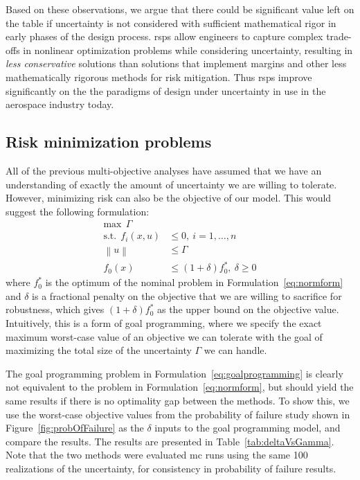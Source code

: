 Based on these observations, we argue that there could be significant value left on the table
if uncertainty is not considered with sufficient mathematical rigor in early phases of
the design process. \gls{rsp}s allow engineers to capture complex
trade-offs in nonlinear optimization problems while considering uncertainty,
resulting in \emph{less conservative} solutions
than solutions that implement margins and other less mathematically
rigorous methods for risk mitigation. Thus \gls{rsp}s improve significantly on the
the paradigms of design under uncertainty in use in the aerospace industry today.

\subsection{Risk minimization problems}

All of the previous multi-objective analyses have assumed that we have an
understanding of exactly the amount of uncertainty we are
willing to tolerate. However, minimizing risk can also be the objective of our
model. This would suggest the following formulation:
\begin{equation}
    \begin{split}
    \text{max}~~\Gamma \\
    \text{s.t.}~~f_i(x,u) &\leq 0,~i = 1,\ldots,n \\
                    \left\lVert u \right\rVert &\leq \Gamma \\
                    f_0(x) &\leq (1+\delta)f_0^*,~\delta \geq 0
    \end{split}
    \label{eq:goalprogramming}
\end{equation}
where $f_0^*$ is the optimum of the nominal problem in Formulation~\ref{eq:normform} and $\delta$
is a fractional penalty on the objective that we are willing to sacrifice for robustness, which
gives $(1+\delta)f_0^*$ as the upper bound on the objective value. Intuitively,
this is a form of goal programming,
where we specify the exact maximum worst-case value of an objective we can tolerate with
the goal of maximizing the total size of the uncertainty $\Gamma$ we can handle.

The goal programming problem in Formulation~\ref{eq:goalprogramming} is clearly
not equivalent to the problem in Formulation~\ref{eq:normform},
but should yield the same results if there is no
optimality gap between the methods.
To show this, we use the worst-case objective values from the probability of failure study
shown in Figure~\ref{fig:probOfFailure} as the $\delta$ inputs to the goal programming model, and compare the results.
The results are presented in
Table~\ref{tab:deltaVsGamma}. Note that the two methods were evaluated \gls{mc} runs using the same 100 realizations
of the uncertainty, for consistency in probability of failure results.

